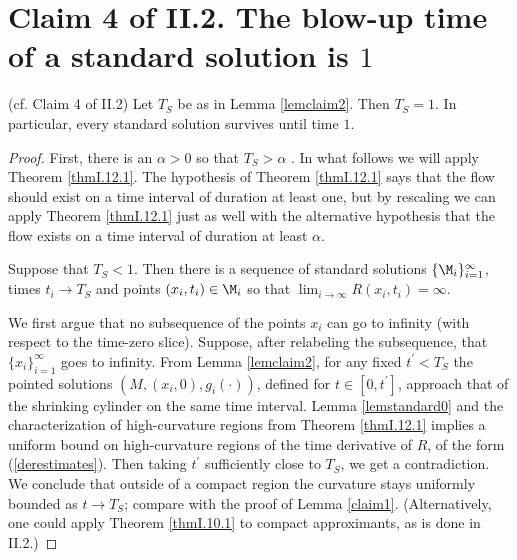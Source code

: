 \section{Claim 4 of II.2.
The blow-up time of a standard solution is $1$}
\label{secclaim4}

\begin{lemma}
  \label{lem:kl-blow-up-time-standard-solution-standard-solutions-lemma}
 (cf. Claim 4 of II.2) \label{lemclaim4}
Let $T_S$ be as in  Lemma \ref{lemclaim2}. Then $T_S=1$.
In particular, every standard solution survives until time $1$.
\end{lemma}
\begin{proof}
First, there is an
$\alpha > 0$
so that $T_S > \alpha$ \cite[Theorem 1.1]{Shi2 (1989)}.
In what follows we will apply Theorem \ref{thmI.12.1}. The
hypothesis of Theorem \ref{thmI.12.1} says that the flow
should exist on a time interval of duration at least one,
but by
rescaling we can apply Theorem \ref{thmI.12.1} just as well
with the alternative hypothesis that the
flow exists on a time interval of duration
at least $\alpha$.

Suppose that $T_S < 1$.
Then there is a sequence of standard solutions
$\{\M_i\}_{i=1}^\infty$,
times $t_i \rightarrow T_S$ and points $(x_i,t_i)\in \M_i$ so that
$\lim_{i \rightarrow \infty} R(x_i, t_i) = \infty$.

We first
argue that no subsequence of the points $x_i$ can go to infinity (with respect
to the time-zero slice). Suppose, after relabeling the subsequence, that
$\{x_i\}_{i=1}^\infty$ goes to infinity.
From Lemma \ref{lemclaim2},
for any fixed $t^\prime < T_S$ the pointed solutions
$(M,(x_i, 0), g_i(\cdot))$, defined for $t \in [0, t^\prime]$,
approach that of the shrinking cylinder on the same time interval.
Lemma \ref{lemstandard0} and the characterization of high-curvature regions from
Theorem \ref{thmI.12.1} implies a
uniform bound on high-curvature regions of the time derivative of $R$, of the form
(\ref{derestimates}). Then taking $t^\prime$
sufficiently close to $T_S$, we get a contradiction.
We conclude that outside of a compact
region the curvature stays uniformly bounded as $t \rightarrow T_S$;
compare with the proof of Lemma \ref{claim1}.
(Alternatively, one could apply Theorem \ref{thmI.10.1} to compact
approximants, as is done in II.2.)


\end{proof}
